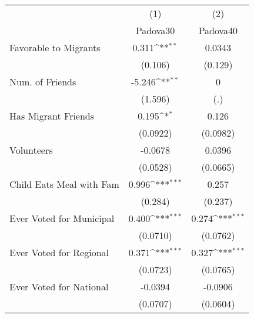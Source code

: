 {
\def\sym#1{\ifmmode^{#1}\else\(^{#1}\)\fi}
\begin{tabular}{l*{2}{c}}
\toprule
            &\multicolumn{1}{c}{(1)}&\multicolumn{1}{c}{(2)}\\
            &\multicolumn{1}{c}{Padova30}&\multicolumn{1}{c}{Padova40}\\
\midrule
Favorable to Migrants&       0.311\sym{**} &      0.0343         \\
            &     (0.106)         &     (0.129)         \\
\addlinespace
Num. of Friends&      -5.246\sym{**} &           0         \\
            &     (1.596)         &         (.)         \\
\addlinespace
Has Migrant Friends&       0.195\sym{*}  &       0.126         \\
            &    (0.0922)         &    (0.0982)         \\
\addlinespace
Volunteers  &     -0.0678         &      0.0396         \\
            &    (0.0528)         &    (0.0665)         \\
\addlinespace
Child Eats Meal with Fam&       0.996\sym{***}&       0.257         \\
            &     (0.284)         &     (0.237)         \\
\addlinespace
Ever Voted for Municipal&       0.400\sym{***}&       0.274\sym{***}\\
            &    (0.0710)         &    (0.0762)         \\
\addlinespace
Ever Voted for Regional&       0.371\sym{***}&       0.327\sym{***}\\
            &    (0.0723)         &    (0.0765)         \\
\addlinespace
Ever Voted for National&     -0.0394         &     -0.0906         \\
            &    (0.0707)         &    (0.0604)         \\
\bottomrule
\end{tabular}
}
